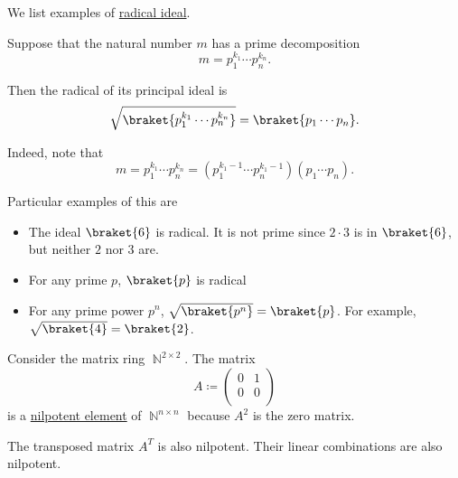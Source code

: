 \begin{example}\label{ex:def:radical_ideal}
  We list examples of \hyperref[def:radical_ideal]{radical ideal}.

  \begin{thmenum}
     Suppose that the natural number \( m \) has a prime decomposition
    \begin{equation*}
      m = p_1^{k_1} \cdots p_n^{k_n}.
    \end{equation*}

    Then the radical of its principal ideal is
    \begin{equation*}
      \sqrt{ \braket{ p_1^{k_1} \cdots p_n^{k_n} } } = \braket{ p_1 \cdots p_n }.
    \end{equation*}

    Indeed, note that
    \begin{equation*}
      m = p_1^{k_1} \cdots p_n^{k_n} = (p_1^{k_1-1} \cdots p_n^{k_1-1}) (p_1 \cdots p_n).
    \end{equation*}

    Particular examples of this are
    \begin{itemize}
      \item The ideal \( { \braket{ 6 } } \) is radical. It is not prime since \( 2 \cdot 3 \) is in \( \braket{ 6 } \), but neither \( 2 \) nor \( 3 \) are.

      \item For any prime \( p \), \( \braket{ p } \) is radical

      \item For any prime power \( p^n \), \( \sqrt{\braket{ p^n }} = \braket{ p } \). For example, \( \sqrt{\braket{ 4 }} = \braket{ 2 } \).
    \end{itemize}

     Consider the matrix ring \( \BbbN^{2 \times 2} \). The matrix
    \begin{equation*}
      A \coloneqq
      \begin{pmatrix}
        0 & 1 \\
        0 & 0 \\
      \end{pmatrix}
    \end{equation*}
    is a \hyperref[def:radical_ideal]{nilpotent element} of \( \BbbN^{n \times n} \) because \( A^2 \) is the zero matrix.

    The transposed matrix \( A^T \) is also nilpotent. Their linear combinations are also nilpotent.
  \end{thmenum}
\end{example}
